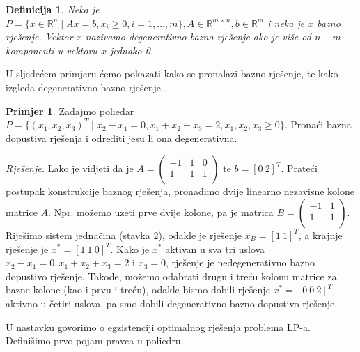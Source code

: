 \documentclass[b5paper, utf8, 11pt, colorlinks]{book}
\newtheorem{definition}{Definicija}[chapter]
\theoremstyle{definition}
\newtheorem{primjer}{Primjer}[chapter]
\begin{document}
\begin{definition}
      Neka je $P = \{ x \in \mathbb{R}^n \mid A x = b,  x_i \geq 0, i=1,\ldots,m \}, A \in \mathbb{R}^{m \times n}, b \in \mathbb{R}^m$    i neka je $x$ bazno rješenje. Vektor $x$ nazivamo degenerativno bazno rješenje ako je više od $n-m$ komponenti u vektoru $x$   jednako 0.
\end{definition}
U sljedećem primjeru ćemo pokazati kako se pronalazi bazno rješenje, te kako izgleda degenerativno bazno rješenje.

\begin{primjer} Zadajmo poliedar $P= \{ (x_1,x_2,x_3)^T \mid x_2 - x_1 = 0, x_1 + x_2 +   x_3 = 2, x_1,x_2,x_3 \geq 0 \}$.  Pronaći bazna dopustiva rješenja i odrediti jesu li ona degenerativna. 
\end{primjer}

\emph{Rješenje.} Lako je vidjeti da je  
$A=\left (\begin{array}{ccc}
   -1  &  1 & 0  \\
   1  &  1 & 1 \\
\end{array} \right )$ te $b = [0\ 2]^T$. Prateći postupak konstrukcije baznog rješenja, pronađimo dvije linearno nezavisne kolone matrice $A$. Npr. možemo uzeti prve dvije kolone, pa je matrica $B=\left (\begin{array}{cc}
   -1  & 1    \\
   1  &  1   \\
\end{array} \right ) .$ Riješimo sistem jednačina (stavka 2), odakle je rješenje $x_B = [1\ 1]^T$, a krajnje rješenje je $x^* = [1\ 1\ 0]^T$. Kako je 
$x^*$ aktivan u sva tri uslova $x_2 - x_1 = 0, x_1 + x_2 +  x_3 = 2$ i $x_3 = 0$, rješenje je nedegenerativno bazno dopustivo rješenje.  Takođe, možemo odabrati drugu i treću kolonu matrice za bazne kolone (kao i prvu i treću), odakle bismo dobili rješenje $x^* = [0\ 0\ 2]^T$, aktivno u četiri uslova, pa smo dobili degenerativno bazno dopustivo rješenje. 


U nastavku govorimo o egzistenciji optimalnog rješenja problema LP-a. Definišimo prvo pojam pravca u poliedru.
\end{document}
